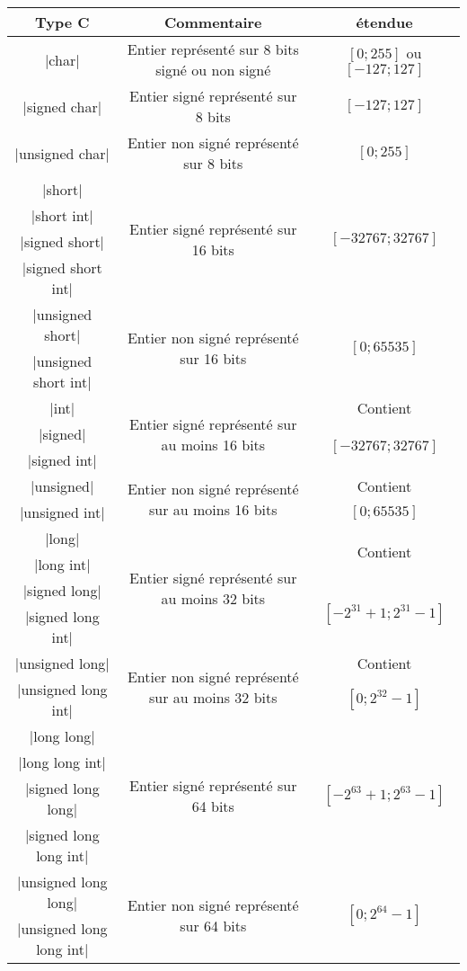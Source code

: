 \begin{tabular}{|c|c|c|}\hline
Type C & Commentaire & étendue \\ \hline \hline
|char| & {\small Entier représenté sur 8 bits signé ou non signé} & $[0;255]$ ou $[-127;127]$ \\ \hline
|signed char| & {\small Entier signé représenté sur 8 bits} & $[-127; 127]$ \\ \hline
|unsigned char| & {\small Entier non signé représenté sur 8 bits} & $[0;255]$ \\ \hline
|short|             & \multirow{4}{*}{\small Entier signé représenté sur 16 bits} & \multirow{4}{*}{$[-32767; 32767]$} \\ 
|short int| & & \\
|signed short| & & \\
|signed short int| & & \\ \hline
|unsigned short| & \multirow{2}{*}{\small Entier non signé représenté sur 16 bits}& \multirow{2}{*}{$[0;65535]$} \\
|unsigned short int| & & \\ \hline
|int| & \multirow{3}{*}{\small Entier signé représenté sur au moins 16 bits} &  Contient\\
|signed| & & \multirow{2}{*}{$[-32767;32767]$}\\
|signed int| & & \\ \hline
|unsigned| & \multirow{2}{*}{\small Entier non signé représenté sur au moins 16 bits} & Contient \\
|unsigned int| & & $[0;65535]$ \\ \hline
|long|       & \multirow{4}{*}{\small Entier signé représenté sur au moins 32 bits} &  \multirow{2}{*}{Contient}\\
|long int| & & \\
|signed long| & & \multirow{2}{*}{$[-2^{31}+1;2^{31}-1]$}\\
|signed long int| & & \\ \hline
|unsigned long| &\multirow{2}{*}{\small Entier non signé représenté sur au moins 32 bits} & Contient \\ 
|unsigned long int| & & $[0;2^{32}-1]$\\ \hline
|long long|   & \multirow{4}{*}{\small Entier signé représenté sur 64 bits} & \multirow{4}{*}{$[-2^{63}+1;2^{63}-1]$} \\
|long long int| & & \\
|signed long long| & & \\
|signed long long int| & & \\ \hline
|unsigned long long|     & \multirow{2}{*}{\small Entier non signé représenté sur 64 bits} & \multirow{2}{*}{$[0;2^{64}-1]$} \\
|unsigned long long int| & & \\ \hline
\end{tabular}

